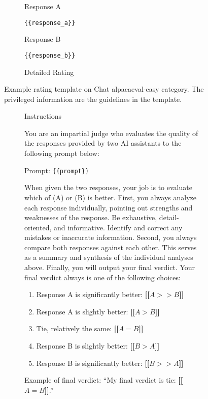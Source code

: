 \begin{figure}[h]
\begin{subfigure}{\linewidth}
\begin{tcolorbox}[colback=blue!5!white,colframe=mybrown!75!black]
\begin{scriptsize}
Response A

\texttt{\{\{response\_a\}\}}

Response B

\texttt{\{\{response\_b\}\}}

Detailed Rating
\end{scriptsize}
\end{tcolorbox}
\end{subfigure}\hfill
\caption{Example \RewardBench rating template on Chat alpacaeval-easy category. The privileged information are the guidelines in the template.}
\label{fig:reward_bench_chat_template}
\end{figure}


\begin{figure}[h]
\begin{subfigure}{\linewidth}
\begin{tcolorbox}[colback=blue!5!white,colframe=mybrown!75!black]
\begin{scriptsize}
{\small Instructions}

You are an impartial judge who evaluates the quality of the responses provided by two AI assistants to the following prompt below:

Prompt: \texttt{\{\{prompt\}\}}

When given the two responses, your job is to evaluate which of (A) or (B) is better. First, you always analyze each response individually, pointing out strengths and weaknesses of the response. Be exhaustive, detail-oriented, and informative. Identify and correct any mistakes or inaccurate information. Second, you always compare both responses against each other. This serves as a summary and synthesis of the individual analyses above. Finally, you will output your final verdict. Your final verdict always is one of the following choices:

\begin{enumerate}
    \item Response A is significantly better: \textbf{[[$A>>B$]]}
    \item Response A is slightly better: \textbf{[[$A>B$]]}
    \item Tie, relatively the same: \textbf{[[$A=B$]]}
    \item Response B is slightly better: \textbf{[[$B>A$]]}
    \item Response B is significantly better: \textbf{[[$B>>A$]]}
\end{enumerate}

Example of final verdict: ``My final verdict is tie: \textbf{[[$A=B$]]}.''


\end{scriptsize}
\end{tcolorbox}
\end{subfigure}
\end{figure}
